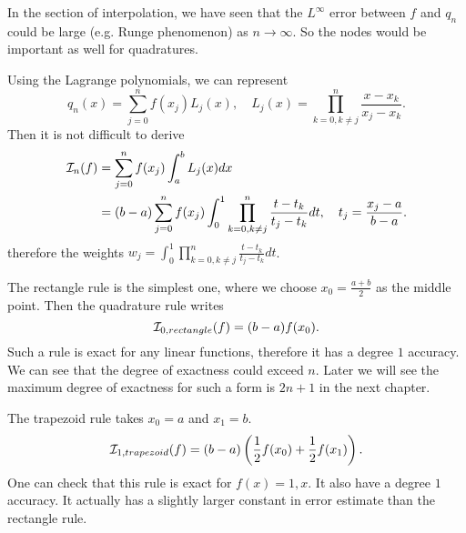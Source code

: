 \begin{remark}
    In the section of interpolation, we have seen that the $L^{\infty}$ error between $f$ and $q_n$ could be large (e.g. Runge phenomenon) as $n\to \infty$. So the nodes would be important as well for quadratures.
\end{remark}
Using the Lagrange polynomials, we can represent 
\begin{equation}
    q_n(x) = \sum_{j=0}^n f(x_j) L_j(x),\quad L_j(x) = \prod_{k=0, k\neq j}^n \frac{x - x_k}{x_j - x_k}. 
\end{equation}
Then it is not difficult to derive
\begin{equation}
    \begin{aligned}
        \mathcal I_n(f)& = \sum_{j=0}^n f(x_j) \int_a^b L_j(x) dx  \\ &=(b-a) \sum_{j=0}^n f(x_j) \int_0^1 \prod_{k=0, k\neq j }^n \frac{t - t_k}{t_j - t_k} dt, \quad t_j = \frac{x_j - a}{b-a}.   
    \end{aligned}
\end{equation}
therefore the weights $w_j =  \int_0^1 \prod_{k=0, k\neq j }^n \frac{t - t_k}{t_j - t_k} dt$. 

\begin{example}
   The rectangle rule is the simplest one, where we choose $x_0 = \frac{a+b}{2}$ as the middle point. Then the quadrature rule writes
   $$\mathcal I_{0, rectangle}(f)  = (b-a) f(x_0). $$
  Such a rule is exact for any linear functions, therefore it has a degree $1$ accuracy. We can see that the degree of exactness could exceed $n$. Later we will see the maximum degree of exactness for such a form is $2n+1$ in the next chapter.
\end{example}

\begin{example}
The trapezoid rule takes $x_0 = a$ and $x_1= b$. 
$$\mathcal I_{1,trapezoid} (f) = (b-a)\left( \frac{1}{2} f(x_0) + \frac{1}{2} f(x_1) \right).$$
One can check that this rule is exact for $f(x) = 1, x$. It also have a degree $1$ accuracy. It actually has a slightly larger constant in error estimate than the rectangle rule.
\end{example}
